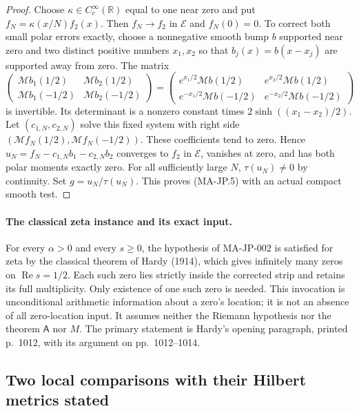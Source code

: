 \begin{proof}
Choose $\kappa\in C_c^\infty(\mathbb R)$ equal to one
near zero and put $f_N=\kappa(x/N)f_2(x)$.
Then $f_N\to f_2$ in $\mathcal E$ and $f_N(0)=0$.
To correct both small polar errors exactly, choose a
nonnegative smooth bump $b$ supported near zero and
two distinct positive numbers $x_1,x_2$ so that
$b_j(x)=b(x-x_j)$ are supported away from zero.
The matrix
\[
 \begin{pmatrix}
 \mathcal Mb_1(1/2)&\mathcal Mb_2(1/2)\\
 \mathcal Mb_1(-1/2)&\mathcal Mb_2(-1/2)
 \end{pmatrix}
 =
 \begin{pmatrix}
 e^{x_1/2}\mathcal Mb(1/2)&e^{x_2/2}\mathcal Mb(1/2)\\
 e^{-x_1/2}\mathcal Mb(-1/2)&e^{-x_2/2}\mathcal Mb(-1/2)
 \end{pmatrix}
 \tag{MA-JP.8}
\]
is invertible.  Its determinant is a nonzero constant
times $2\sinh((x_1-x_2)/2)$.
Let $(c_{1,N},c_{2,N})$ solve this fixed system with
right side $(\mathcal Mf_N(1/2),\mathcal Mf_N(-1/2))$.
These coefficients tend to zero.  Hence
$u_N=f_N-c_{1,N}b_1-c_{2,N}b_2$ converges to $f_2$
in $\mathcal E$, vanishes at zero, and has both polar
moments exactly zero.  For all sufficiently large $N$,
$\tau(u_N)\ne0$ by continuity.  Set
$g=u_N/\tau(u_N)$.  This proves (MA-JP.5) with an
actual compact smooth test.
\end{proof}

\paragraph{The classical zeta instance and its exact input.}
For every $\alpha>0$ and every $s\ge0$, the hypothesis of
MA-JP-002 is satisfied for zeta by the classical theorem
of Hardy (1914), which gives infinitely many zeros on
$\operatorname{Re}s=1/2$.  Each such zero lies strictly
inside the corrected strip and retains its full multiplicity.
Only existence of one such zero is needed.
This invocation is unconditional arithmetic information
about a zero's location; it is not an absence of all
zero-location input.  It assumes neither the Riemann
hypothesis nor the theorem $\mathsf A$ nor $M$.
The primary statement is Hardy's opening paragraph,
printed p.~1012, with its argument on pp.~1012--1014.

\subsection{Two local comparisons with their Hilbert metrics stated}

